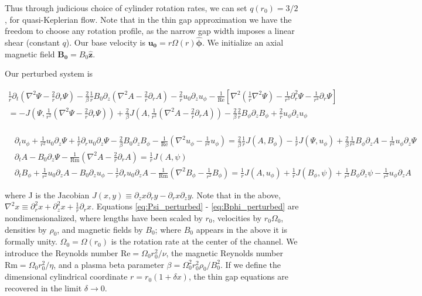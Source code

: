 \documentclass[onecolumn]{emulateapj}
\newcommand{\beq}{\begin{equation}}
\newcommand{\eeq}{\end{equation}}
\newcommand\reye{\mathrm{Re}}
\newcommand\reym{\mathrm{Rm}}
\newcommand{\uphi}{\ensuremath{u_\phi}}
\newcommand{\phihat}{\ensuremath{\mathbf{\hat{\phi}}}}
\newcommand{\zhat}{\ensuremath{\mathbf{\hat{z}}}}
\begin{document}
Thus through judicious choice of cylinder rotation rates, we can set $q(r_0) = 3/2$, for quasi-Keplerian flow. Note that in the thin gap approximation we have the freedom to choose any rotation profile, as the narrow gap width imposes a linear shear (constant $q$). Our base velocity is $\mathbf{u_0} = r\Omega(r) \phihat$. We initialize an axial magnetic field $\mathbf{B_0} = B_0 \zhat$. 

Our perturbed system is 

\beq
\begin{split}
\label{eq:Psi_perturbed}
\frac{1}{r}\partial_t (\nabla^2 \Psi - \frac{2}{r} \partial_r \Psi) - \frac{2}{\beta} \frac{1}{r}B_0 \partial_z (\nabla^2 A - \frac{2}{r} \partial_r A) - \frac{2}{r}u_0 \partial_z u_\phi - \frac{1}{\reye} \left[ \nabla^2 (\frac{1}{r} \nabla^2 \Psi) - \frac{1}{r^3} \partial_r^2 \Psi - \frac{1}{r^4}\partial_r\Psi\right] \\
= - J(\Psi, \frac{1}{r^2} ( \nabla^2 \Psi - \frac{2}{r} \partial_r\Psi) ) + \frac{2}{\beta} J(A, \frac{1}{r^2} ( \nabla^2 A - \frac{2}{r} \partial_rA) ) - \frac{2}{\beta} \frac{2}{r}B_\phi \partial_z B_\phi  + \frac{2}{r} u_\phi \partial_z u_\phi \\
\end{split}
\eeq

\begin{align}
& \partial_t \uphi + \frac{1}{r^2} u_0 \partial_z \Psi + \frac{1}{r} \partial_r u_0 \partial_z \Psi - \frac{2}{\beta} B_0 \partial_z B_\phi - \frac{1}{\reye} ( \nabla^2 \uphi - \frac{1}{r^2} \uphi ) = \frac{2}{\beta} \frac{1}{r} J(A, B_\phi) - \frac{1}{r} J(\Psi, \uphi) + \frac{2}{\beta}\frac{1}{r^2} B_\phi \partial_z A - \frac{1}{r^2} \uphi \partial_z \Psi \label{eq:uphi_perturbed} \\
& \partial_t A - B_0 \partial_z \Psi - \frac{1}{\reym} ( \nabla^2 A - \frac{2}{r} \partial_r A )= \frac{1}{r} J(A, \psi)  \label{eq:A_perturbed}\\
  \label{eq:Bphi_perturbed}
& \partial_t B_\phi + \frac{1}{r^2} u_0 \partial_z A - B_0 \partial_z u_\phi - \frac{1}{r} \partial_r u_0 \partial_z A - \frac{1}{\reym} (\nabla^2 B_\phi - \frac{1}{r^2} B_\phi ) = \frac{1}{r} J(A, \uphi) + \frac{1}{r} J(B_\phi, \psi)
+ \frac{1}{r^2} B_\phi \partial_z \psi - \frac{1}{r^2} \uphi \partial_z A 
\end{align}

where J is the Jacobian $J(x, y) \equiv \partial_z x \partial_r y - \partial_r x \partial_z y$. Note that in the above, $\nabla^2 x \equiv \partial_r^2 x + \partial_z^2 x + \frac{1}{r} \partial_r x$. Equations \ref{eq:Psi_perturbed} - \ref{eq:Bphi_perturbed} are nondimensionalized, where lengths have been scaled by $r_0$, velocities by $r_0 \Omega_0$, densities by $\rho_0$, and magnetic fields by $B_0$; where $B_0$ appears in the above it is formally unity. $\Omega_0 = \Omega(r_0)$ is the rotation rate at the center of the channel. We introduce the Reynolds number $\reye = \Omega_0 r_0^2/\nu$, the magnetic Reynolds number $\reym = \Omega_0 r_0^2 / \eta$, and a plasma beta parameter $\beta = \Omega_0^2 r_0^2 \rho_0/B_0^2$. If we define the dimensional cylindrical coordinate $r = r_0(1 + \delta x)$, the thin gap equations are recovered in the limit $\delta \rightarrow 0$.
\end{document}
